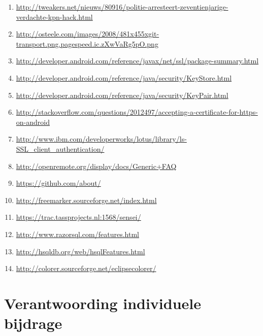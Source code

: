 \documentclass[]{article}
\begin{document}
\begin{enumerate}

    \item \url{http://tweakers.net/nieuws/80916/politie-arresteert-zeventienjarige-verdachte-kpn-hack.html}
    \item \url{http://osteele.com/images/2008/481x455xgit-transport.png.pagespeed.ic.zXwVaRg5pO.png}
    \item \url{http://developer.android.com/reference/javax/net/ssl/package-summary.html}
    \item \url{http://developer.android.com/reference/java/security/KeyStore.html}
    \item \url{http://developer.android.com/reference/java/security/KeyPair.html}
    \item \url{http://stackoverflow.com/questions/2012497/accepting-a-certificate-for-https-on-android}
    \item \url{http://www.ibm.com/developerworks/lotus/library/ls-SSL_client_authentication/}
    \item \url{http://openremote.org/display/docs/Generic+FAQ}
    \item \url{https://github.com/about/}
    \item \url{http://freemarker.sourceforge.net/index.html}
    \item \url{https://trac.tassprojects.nl:1568/sensei/}
    \item \url{http://www.razorsql.com/features.html}
    \item \url{http://hsqldb.org/web/hsqlFeatures.html}
    \item \url{http://colorer.sourceforge.net/eclipsecolorer/}

\end{enumerate}

\newpage
\section{Verantwoording individuele bijdrage}
\end{document}
